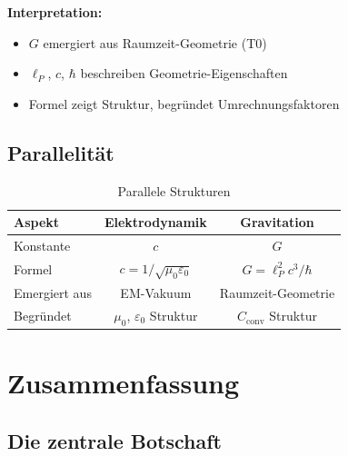 	\textbf{Interpretation:}
	\begin{itemize}
		\item $G$ emergiert aus Raumzeit-Geometrie (T0)
		\item $\ell_P$, $c$, $\hbar$ beschreiben Geometrie-Eigenschaften
		\item Formel zeigt Struktur, begründet Umrechnungsfaktoren
	\end{itemize}
	
	\subsection{Parallelität}
	
	\begin{table}[h]
		\centering
		\begin{tabular}{|l|c|c|}
			\hline
			\textbf{Aspekt} & \textbf{Elektrodynamik} & \textbf{Gravitation} \\
			\hline
			Konstante & $c$ & $G$ \\
			Formel & $c = 1/\sqrt{\mu_0\varepsilon_0}$ & $G = \ell_P^2 c^3/\hbar$ \\
			Emergiert aus & EM-Vakuum & Raumzeit-Geometrie \\
			Begründet & $\mu_0$, $\varepsilon_0$ Struktur & $C_{\text{conv}}$ Struktur \\
			\hline
		\end{tabular}
		\caption{Parallele Strukturen}
	\end{table}
	
	\section{Zusammenfassung}
	
	\subsection{Die zentrale Botschaft}
	
